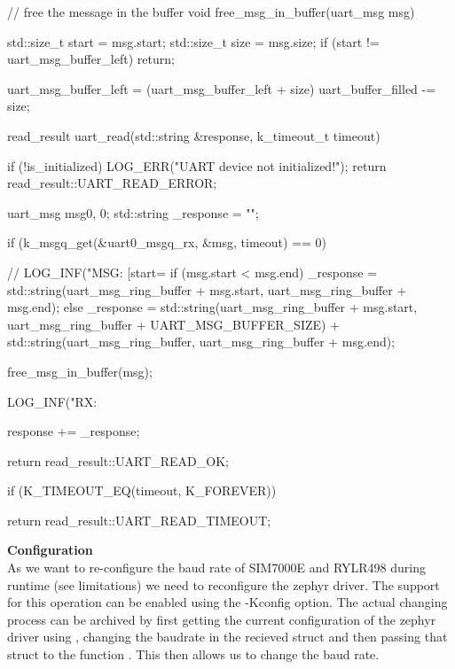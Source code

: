 \begin{cpp}
// free the message in the buffer
void free_msg_in_buffer(uart_msg msg)
{
    std::size_t start = msg.start;
    std::size_t size = msg.size;
    if (start != uart_msg_buffer_left)
    {
        return;
    }

    uart_msg_buffer_left = (uart_msg_buffer_left + size) %
    uart_buffer_filled -= size;
}

read_result uart_read(std::string &response, k_timeout_t timeout)
{
    if (!is_initialized)
    {
        LOG_ERR("UART device not initialized!");
        return read_result::UART_READ_ERROR;
    }

    uart_msg msg{0, 0};
    std::string _response = "";

    if (k_msgq_get(&uart0_msgq_rx, &msg, timeout) == 0)
    {
        // LOG_INF("MSG: [start=%
        if (msg.start < msg.end)
        {
            _response = std::string(uart_msg_ring_buffer + msg.start, uart_msg_ring_buffer + msg.end);
        }
        else
        {
            _response = std::string(uart_msg_ring_buffer + msg.start, uart_msg_ring_buffer + UART_MSG_BUFFER_SIZE) + std::string(uart_msg_ring_buffer, uart_msg_ring_buffer + msg.end);
        }

        free_msg_in_buffer(msg);

        LOG_INF("RX: %

        response += _response;

        return read_result::UART_READ_OK;
    }

    if (K_TIMEOUT_EQ(timeout, K_FOREVER))
    {
    }

    return read_result::UART_READ_TIMEOUT;
}
\end{cpp}

\textbf{Configuration} \\
As we want to re-configure the baud rate of  SIM7000E and RYLR498 during runtime (see limitations) we need to reconfigure the zephyr driver. The support for this operation can be enabled using the -Kconfig option.
The actual changing process can be archived by first getting the current configuration of the zephyr driver using , changing the baudrate in the recieved struct and then passing that struct to the function . This then allows us to change the baud rate.

